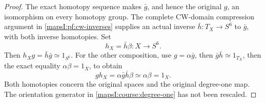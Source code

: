 \begin{proof}
The exact homotopy sequence makes \(\bar g\), and hence the original
\(g\), an isomorphism on every homotopy group.  The complete CW-domain
compression argument in \cref{mapsI:pf:cw-inverses} supplies an actual
inverse \(\bar h:T_X\to S^6\) to \(\bar g\), with both inverse
homotopies.  Set
\[
 h_X=\bar h\beta:X\longrightarrow S^6.
\]
Then \(h_Xg=\bar h\bar g\simeq1_{S^6}\).  For the other composition,
use \(g=\alpha\bar g\), then \(\bar g\bar h\simeq1_{T_X}\), then
the exact equality \(\alpha\beta=1_X\), to obtain
\[
 gh_X=\alpha\bar g\bar h\beta\simeq\alpha\beta=1_X.
\]
Both homotopies concern the original spaces and the original degree-one
map.  The orientation generator in \eqref{mapsI:course:degree-one}
has not been rescaled.
\end{proof}
